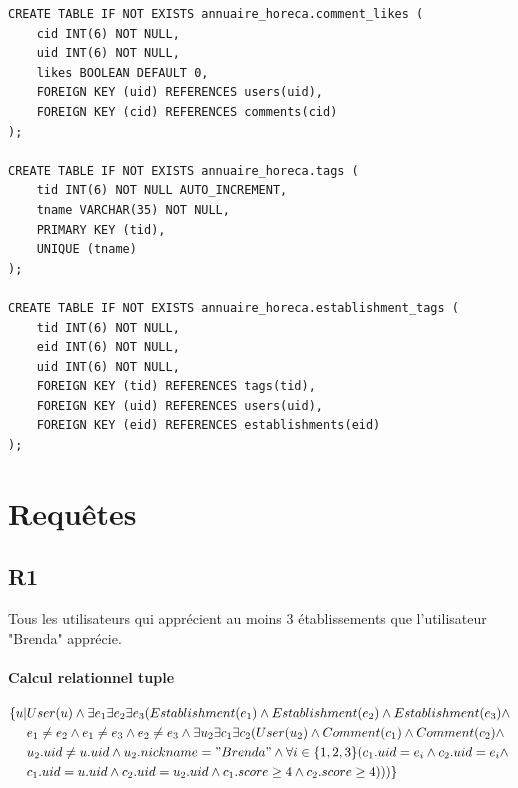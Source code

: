 \documentclass[11pt,a4paper]{report}
\begin{document}
\begin{verbatim}
CREATE TABLE IF NOT EXISTS annuaire_horeca.comment_likes (
    cid INT(6) NOT NULL,
    uid INT(6) NOT NULL,
    likes BOOLEAN DEFAULT 0,
    FOREIGN KEY (uid) REFERENCES users(uid),
    FOREIGN KEY (cid) REFERENCES comments(cid)
);

CREATE TABLE IF NOT EXISTS annuaire_horeca.tags (
    tid INT(6) NOT NULL AUTO_INCREMENT,
    tname VARCHAR(35) NOT NULL,
    PRIMARY KEY (tid),
    UNIQUE (tname)
);

CREATE TABLE IF NOT EXISTS annuaire_horeca.establishment_tags (
    tid INT(6) NOT NULL,
    eid INT(6) NOT NULL,
    uid INT(6) NOT NULL,
    FOREIGN KEY (tid) REFERENCES tags(tid),
    FOREIGN KEY (uid) REFERENCES users(uid),
    FOREIGN KEY (eid) REFERENCES establishments(eid)
);
\end{verbatim}

\section*{Requêtes}

\subsection*{R1}

\noindent Tous les utilisateurs qui apprécient au moins 3 établissements que l'utilisateur "Brenda" apprécie.
\paragraph*{Calcul relationnel tuple}
\begin{align*}
\{ u | & User(u) \wedge \exists e_{1} \exists e_{2} \exists e_{3} ( Establishment(e_{1}) \wedge
Establishment(e_{2}) \wedge Establishment(e_{3}) \wedge \\ 
& e_{1} \neq e_{2} \wedge e_{1} \neq e_{3} \wedge e_{2} \neq e_{3} \wedge \exists u_{2} \exists c_{1} \exists c_{2} ( User(u_{2}) \wedge Comment(c_{1}) \wedge Comment(c_{2}) \wedge \\
& u_{2}.uid \neq u.uid \wedge u_{2}.nickname = "Brenda" \wedge \forall i \in \{1,2,3 \}(c_{1}.uid=e_{i} \wedge c_{2}.uid=e_{i} \wedge  \\
& c_{1}.uid = u.uid \wedge c_{2}.uid = u_{2}.uid \wedge  c_{1}.score \geq 4 \wedge  c_{2}.score \geq 4  )))
\}
\end{align*}
\end{document}
